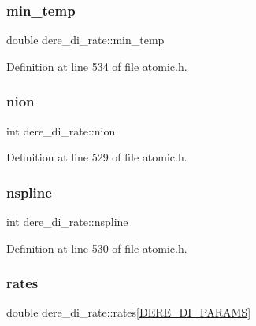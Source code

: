 \subsubsection{\texorpdfstring{min\+\_\+temp}{min\_temp}}
{\footnotesize\ttfamily double dere\+\_\+di\+\_\+rate\+::min\+\_\+temp}



Definition at line 534 of file atomic.\+h.

\mbox{\label{structdere__di__rate_ad3fcb19ca4d3aa30ac03534b6ab383f6}} 
\subsubsection{\texorpdfstring{nion}{nion}}
{\footnotesize\ttfamily int dere\+\_\+di\+\_\+rate\+::nion}



Definition at line 529 of file atomic.\+h.

\mbox{\label{structdere__di__rate_a6cf66a009bc483a7058ada0976ec1b0b}} 
\subsubsection{\texorpdfstring{nspline}{nspline}}
{\footnotesize\ttfamily int dere\+\_\+di\+\_\+rate\+::nspline}



Definition at line 530 of file atomic.\+h.

\mbox{\label{structdere__di__rate_a50668066ca7379e573d226ccbf0ddf8b}} 
\subsubsection{\texorpdfstring{rates}{rates}}
{\footnotesize\ttfamily double dere\+\_\+di\+\_\+rate\+::rates\mbox{[}\hyperlink{atomic_8h_aefebf0841dbe3a3fded75a69142f8fa2}{D\+E\+R\+E\+\_\+\+D\+I\+\_\+\+P\+A\+R\+A\+MS}\mbox{]}}



